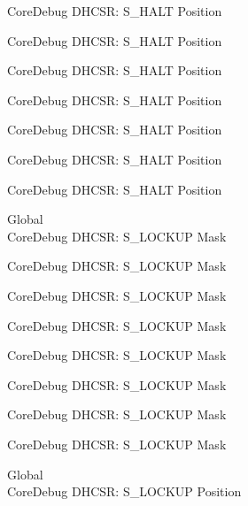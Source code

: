 \begin{DoxyRefList}
\label{deprecated__deprecated000117}%
%
Core\+Debug DHCSR\+: S\+\_\+\+HALT Position 

\label{deprecated__deprecated000171}%
%
Core\+Debug DHCSR\+: S\+\_\+\+HALT Position 

\label{deprecated__deprecated000256}%
%
Core\+Debug DHCSR\+: S\+\_\+\+HALT Position 

\label{deprecated__deprecated000313}%
%
Core\+Debug DHCSR\+: S\+\_\+\+HALT Position 

\label{deprecated__deprecated000389}%
%
Core\+Debug DHCSR\+: S\+\_\+\+HALT Position 

\label{deprecated__deprecated000476}%
%
Core\+Debug DHCSR\+: S\+\_\+\+HALT Position 

\label{deprecated__deprecated000578}%
%
Core\+Debug DHCSR\+: S\+\_\+\+HALT Position  
\item[Global \doxylink{group___c_m_s_i_s___core_debug_ga7b67e4506d7f464ef5dafd6219739756}{Core\+Debug\+\_\+\+DHCSR\+\_\+\+S\+\_\+\+LOCKUP\+\_\+\+Msk} ]\hfill \\
\label{deprecated__deprecated000022}%
%
Core\+Debug DHCSR\+: S\+\_\+\+LOCKUP Mask 

\label{deprecated__deprecated000114}%
%
Core\+Debug DHCSR\+: S\+\_\+\+LOCKUP Mask 

\label{deprecated__deprecated000168}%
%
Core\+Debug DHCSR\+: S\+\_\+\+LOCKUP Mask 

\label{deprecated__deprecated000253}%
%
Core\+Debug DHCSR\+: S\+\_\+\+LOCKUP Mask 

\label{deprecated__deprecated000310}%
%
Core\+Debug DHCSR\+: S\+\_\+\+LOCKUP Mask 

\label{deprecated__deprecated000386}%
%
Core\+Debug DHCSR\+: S\+\_\+\+LOCKUP Mask 

\label{deprecated__deprecated000473}%
%
Core\+Debug DHCSR\+: S\+\_\+\+LOCKUP Mask 

\label{deprecated__deprecated000575}%
%
Core\+Debug DHCSR\+: S\+\_\+\+LOCKUP Mask  
\item[Global \doxylink{group___c_m_s_i_s___core_debug_ga2900dd56a988a4ed27ad664d5642807e}{Core\+Debug\+\_\+\+DHCSR\+\_\+\+S\+\_\+\+LOCKUP\+\_\+\+Pos} ]\hfill \\
\label{deprecated__deprecated000021}%
%
Core\+Debug DHCSR\+: S\+\_\+\+LOCKUP Position 


\end{DoxyRefList}
